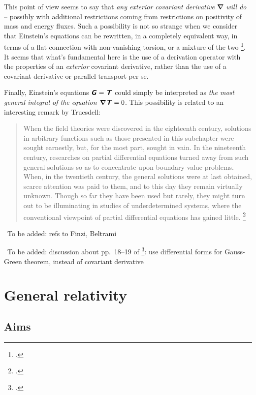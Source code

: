 \documentclass[\ifafour a4paper,12pt,\else a5paper,10pt,\fi%
onecolumn,oneside,article,%
british%
]{memoir}
\theoremstyle{remark}
\theoremstyle{innote}
\newcommand*{\mathte}[1]{\textbf{\textit{\textsf{#1}}}}
\newcommand*{\citep}{\footcites}%
\renewcommand*{\|}{\nonscript\,\vert\nonscript\;\mathopen{}}
\newcommand*{\puzzle}{{\fontencoding{U}\fontfamily{fontawesometwo}\selectfont\symbol{225}}}
\newcommand{\mynote}[1]{ {\color{notecolour}\puzzle\ #1}}
\newcommand*{\yEii}{G}
\newcommand*{\yEi}{\mathte{\yEii}}
\newcommand*{\yTTf}{T}
\newcommand*{\yTf}{\mathte{\yTTf}}
\newcommand*{\yDi}{\bm{\nabla}}
\begin{document}
This point of view seems to say that \emph{any exterior covariant
  derivative $\yDi$ will do} -- possibly with additional restrictions
coming from restrictions on positivity of mass and energy fluxes. Such a
possibility is not so strange when we consider that Einstein's equations
can be rewritten, in a completely equivalent way, in terms of a flat
connection with non-vanishing torsion, or a mixture of the two
\citep{deandradeetal2000,arcosetal2004,aldrovandietal2013,pereira2014,caietal2016}.
It seems that what's fundamental here is the use of a derivation operator
with the properties of an \emph{exterior} covariant derivative, rather than
the use of a covariant derivative or parallel transport per se.

Finally, Einstein's equations $\yEi = \yTf$ could simply be interpreted as
\emph{the most general integral of the equation $\yDi\yTf = 0$}. This
possibility is related to an interesting remark by Truesdell:
\begin{quote}
  When the field theories were discovered in the eighteenth century, solutions
in arbitrary functions such as those presented in this subchapter were sought
earnestly, but, for the most part, sought in vain. In the nineteenth century,
researches on partial differential equations turned away from such general
solutions so as to concentrate upon boundary-value problems. When, in the
twentieth century, the general solutions were at last obtained, scarce attention
was paid to them, and to this day they remain virtually unknown. Though
so far they have been used but rarely, they might turn out to be illuminating
in studies of underdetermined systems, where the conventional viewpoint of
partial differential equations has gained little.  \citep[p.~594]{truesdelletal1960}
\end{quote}

\mynote{To be added: refs to Finzi, Beltrami}

\mynote{To be added: discussion about pp.~18--19 of \citep{weatherall2017}:
  use differential forms for Gauss-Green theorem, instead of covariant
  derivative}



\section{General relativity}
\label{sec:general_relativity}

\subsection{Aims}
\label{sec:aims_general_rel}
\end{document}
